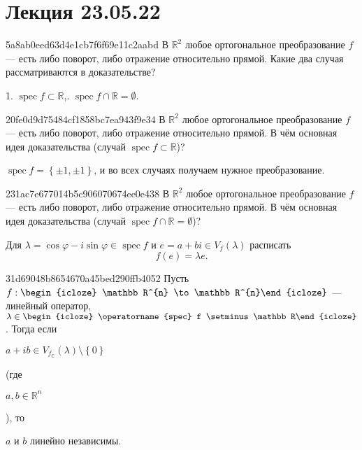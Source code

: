 \section{Лекция 23.05.22}
\begin{note}{5a8ab0eed63d4e1cb7f6f69e11c2aabd}
    В \({ \mathbb R^2 }\) любое ортогональное преобразование \({ f }\) --- есть либо поворот, либо отражение относительно прямой.
    Какие  два случая рассматриваются в доказательстве?

    \begin{cloze}{1}
        1. \({ \operatorname{spec} f \subset  \mathbb R }\),. \({ \operatorname{spec} f \cap \mathbb R = \emptyset }\).
    \end{cloze}
\end{note}

\begin{note}{20fe0d9d75484cf1858bc7ea943f9e34}
    В \({ \mathbb R^2 }\) любое ортогональное преобразование \({ f }\) --- есть либо поворот, либо отражение относительно прямой.
    В чём основная идея доказательства (случай \({ \operatorname{spec} f \subset \mathbb R }\))?

    \begin{cloze}{1}
        \({ \operatorname{spec} f = \left\{ \pm 1, \pm 1 \right\} }\), и во всех случаях получаем нужное преобразование.
    \end{cloze}
\end{note}

\begin{note}{231ac7e677014b5c906070674ee0e438}
    В \({ \mathbb R^2 }\) любое ортогональное преобразование \({ f }\) --- есть либо поворот, либо отражение относительно прямой.
    В чём основная идея доказательства (случай \({ \operatorname{spec} f \cap \mathbb R = \emptyset }\))?

    \begin{cloze}{1}
        Для \({ \lambda = \cos \varphi - i \sin \varphi \in \operatorname{spec} f }\) и \({ e = a + bi \in V_f(\lambda) }\) расписать
        \[
            f(e) = \lambda e.
        \]
    \end{cloze}
\end{note}

\begin{note}{31d69048b8654670a45bed290ffb4052}
    Пусть \({ f : \begin{icloze}{4}\mathbb R^{n} \to \mathbb R^{n}\end{icloze} }\) --- линейный оператор,\: \({ \lambda \in \begin{icloze}{5}\operatorname{spec} f \setminus \mathbb R\end{icloze} }\).
    Тогда если \begin{icloze}{2}\({ a + ib \in V_{f_{\mathbb C}}(\lambda) \setminus \left\{ 0 \right\} }\)\end{icloze} (где \begin{icloze}{3}\({ a, b \in \mathbb R^{n} }\)\end{icloze}), то \begin{icloze}{1}\({ a }\) и \({ b }\) линейно независимы.\end{icloze}
\end{note}

